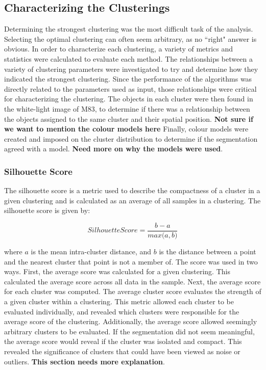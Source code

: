 \subsection{Characterizing the Clusterings}
Determining the strongest clustering was the most difficult task of the analysis.
Selecting the optimal clustering can often seem arbitrary, as no ``right" answer is obvious.
In order to characterize each clustering, a variety of metrics and statistics were calculated to evaluate each method.
The relationships between a variety of clustering parameters were investigated to try and determine how they indicated the strongest clustering.
Since the performance of the algorithms was directly related to the parameters used as input, those relationships were critical for characterizing the clustering.
The objects in each cluster were then found in the white-light image of M83, to determine if there was a relationship between the objects assigned to the same cluster and their spatial position.
\textbf{Not sure if we want to mention the colour models here}
Finally, colour models were created and imposed on the cluster distribution to determine if the segmentation agreed with a model. \textbf{Need more on why the models were used}.

\subsubsection{Silhouette Score}
The silhouette score is a metric used to describe the compactness of a cluster in a given clustering and is calculated as an average of all samples in a clustering.  
The silhouette score is given by:

\begin{equation}
\label{eq:ss}
Silhouette Score = \frac{b - a}{\textit{max}\big(a, b\big)}
\end{equation}

where $a$ is the mean intra-cluster distance, and $b$ is the distance between a point and the nearest cluster that point is not a member of.
The score was used in two ways.
First, the average score was calculated for a given clustering.
This calculated the average score across all data in the sample.
Next, the average score for each cluster was computed.
The average cluster score evaluates the strength of a given cluster within a clustering.
This metric allowed each cluster to be evaluated individually, and revealed which clusters were responsible for the average score of the clustering.
Additionally, the average score allowed seemingly arbitrary clusters to be evaluated.
If the segmentation did not seem meaningful, the average score would reveal if the cluster was isolated and compact.
This revealed the significance of clusters that could have been viewed as noise or outliers. \textbf{This section needs more explanation}.

